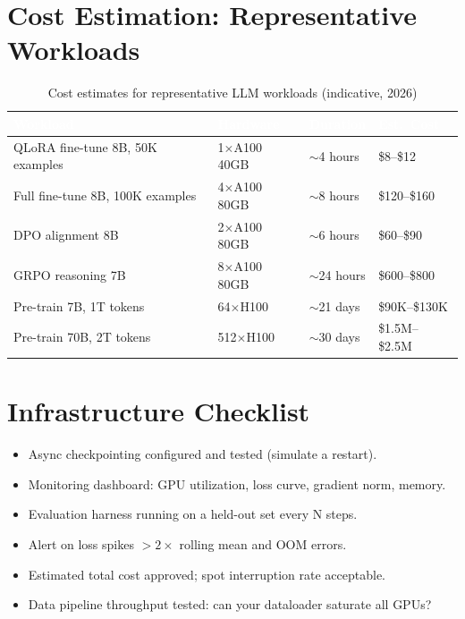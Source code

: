 \section{Cost Estimation: Representative Workloads}

\begin{table}[H]
\centering\small\sffamily
{}
\begin{tabular}{L{3.8cm}L{2.5cm}L{2.5cm}L{2.2cm}}
\toprule
{}\textcolor{white}{\textbf{Workload}} & \textcolor{white}{\textbf{Hardware}} & \textcolor{white}{\textbf{Duration}} & \textcolor{white}{\textbf{Est.\ Cost}} \\
\midrule
QLoRA fine-tune 8B, 50K examples & 1$\times$A100 40GB & $\sim$4 hours & \$8--\$12 \\
Full fine-tune 8B, 100K examples & 4$\times$A100 80GB & $\sim$8 hours & \$120--\$160 \\
DPO alignment 8B & 2$\times$A100 80GB & $\sim$6 hours & \$60--\$90 \\
GRPO reasoning 7B & 8$\times$A100 80GB & $\sim$24 hours & \$600--\$800 \\
Pre-train 7B, 1T tokens & 64$\times$H100 & $\sim$21 days & \$90K--\$130K \\
Pre-train 70B, 2T tokens & 512$\times$H100 & $\sim$30 days & \$1.5M--\$2.5M \\
\bottomrule
\end{tabular}
\caption{Cost estimates for representative LLM workloads (indicative, 2026)}
\end{table}

\section{Infrastructure Checklist}

\begin{patternbox}
\begin{itemize}
  \item \checkmark Async checkpointing configured and tested (simulate a restart).
  \item \checkmark Monitoring dashboard: GPU utilization, loss curve, gradient norm, memory.
  \item \checkmark Evaluation harness running on a held-out set every N steps.
  \item \checkmark Alert on loss spikes $>2\times$ rolling mean and OOM errors.
  \item \checkmark Estimated total cost approved; spot interruption rate acceptable.
  \item \checkmark Data pipeline throughput tested: can your dataloader saturate all GPUs?
\end{itemize}
\end{patternbox}
